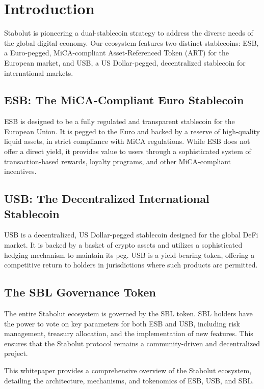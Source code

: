 \setcounter{page}{1} %
\section{Introduction}
Stabolut is pioneering a dual-stablecoin strategy to address the diverse needs of the global digital economy. Our ecosystem features two distinct stablecoins: ESB, a Euro-pegged, MiCA-compliant Asset-Referenced Token (ART) for the European market, and USB, a US Dollar-pegged, decentralized stablecoin for international markets.

\subsection{ESB: The MiCA-Compliant Euro Stablecoin}
ESB is designed to be a fully regulated and transparent stablecoin for the European Union. It is pegged to the Euro and backed by a reserve of high-quality liquid assets, in strict compliance with MiCA regulations. While ESB does not offer a direct yield, it provides value to users through a sophisticated system of transaction-based rewards, loyalty programs, and other MiCA-compliant incentives.

\subsection{USB: The Decentralized International Stablecoin}
USB is a decentralized, US Dollar-pegged stablecoin designed for the global DeFi market. It is backed by a basket of crypto assets and utilizes a sophisticated hedging mechanism to maintain its peg. USB is a yield-bearing token, offering a competitive return to holders in jurisdictions where such products are permitted.

\subsection{The SBL Governance Token}
The entire Stabolut ecosystem is governed by the SBL token. SBL holders have the power to vote on key parameters for both ESB and USB, including risk management, treasury allocation, and the implementation of new features. This ensures that the Stabolut protocol remains a community-driven and decentralized project.

This whitepaper provides a comprehensive overview of the Stabolut ecosystem, detailing the architecture, mechanisms, and tokenomics of ESB, USB, and SBL.
